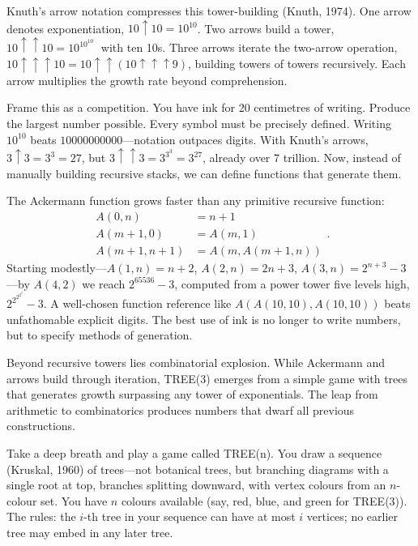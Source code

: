 Knuth's arrow notation compresses this tower-building (Knuth, 1974). One arrow denotes exponentiation, $10 \uparrow 10 = 10^{10}$. Two arrows build a tower, $10 \uparrow\uparrow 10 = 10^{10^{10^{\cdot^{\cdot^{\cdot}}}}}$ with ten 10s. Three arrows iterate the two-arrow operation, $10 \uparrow\uparrow\uparrow 10 = 10 \uparrow\uparrow (10 \uparrow\uparrow\uparrow 9)$, building towers of towers recursively. Each arrow multiplies the growth rate beyond comprehension.

Frame this as a competition. You have ink for 20 centimetres of writing. Produce the largest number possible. Every symbol must be precisely defined. Writing \QSOpen{}$10^{10}$\QSClose{} beats \QSOpen{}$10000000000$\QSClose{}—notation outpaces digits. With Knuth's arrows, $3 \uparrow 3 = 3^3 = 27$, but $3 \uparrow\uparrow 3 = 3^{3^3} = 3^{27}$, already over 7 trillion. Now, instead of manually building recursive stacks, we can define functions that generate them.

The Ackermann function grows faster than any primitive recursive function:
\[
\begin{aligned}
A(0,n) &= n+1 \\
A(m+1,0) &= A(m,1) \\
A(m+1,n+1) &= A(m, A(m+1,n))
\end{aligned}.
\]
Starting modestly—$A(1,n) = n+2$, $A(2,n) = 2n+3$, $A(3,n) = 2^{n+3} - 3$—by $A(4,2)$ we reach $2^{65536} - 3$, computed from a power tower five levels high, $2^{2^{2^{2^2}}} - 3$. A well-chosen function reference like \QSOpen{}$A(A(10,10),A(10,10))$\QSClose{} beats unfathomable explicit digits. The best use of ink is no longer to write numbers, but to specify methods of generation.

Beyond recursive towers lies combinatorial explosion. While Ackermann and arrows build through iteration, TREE(3) emerges from a simple game with trees that generates growth surpassing any tower of exponentials. The leap from arithmetic to combinatorics produces numbers that dwarf all previous constructions.

Take a deep breath and play a game called TREE(n). You draw a sequence (Kruskal, 1960) of trees—not botanical trees, but branching diagrams with a single root at top, branches splitting downward, with vertex colours from an $n$-colour set. You have $n$ colours available (say, red, blue, and green for TREE(3)). The rules: the $i$-th tree in your sequence can have at most $i$ vertices; no earlier tree may embed in any later tree.


